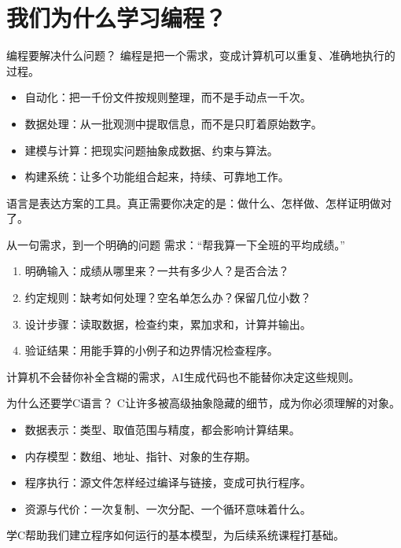 \section{我们为什么学习编程？}

\begin{frame}{编程要解决什么问题？}
    编程是把一个需求，变成计算机可以\alert{重复、准确地执行的过程}。
    \begin{itemize}
        \item 自动化：把一千份文件按规则整理，而不是手动点一千次。
        \item 数据处理：从一批观测中提取信息，而不是只盯着原始数字。
        \item 建模与计算：把现实问题抽象成数据、约束与算法。
        \item 构建系统：让多个功能组合起来，持续、可靠地工作。
    \end{itemize}
    语言是表达方案的工具。真正需要你决定的是：\alert{做什么、怎样做、怎样证明做对了}。
\end{frame}

\begin{frame}{从一句需求，到一个明确的问题}
    需求：“帮我算一下全班的平均成绩。”
    \begin{enumerate}
        \item \alert{明确输入}：成绩从哪里来？一共有多少人？是否合法？
        \item \alert{约定规则}：缺考如何处理？空名单怎么办？保留几位小数？
        \item \alert{设计步骤}：读取数据，检查约束，累加求和，计算并输出。
        \item \alert{验证结果}：用能手算的小例子和边界情况检查程序。
    \end{enumerate}
    计算机不会替你补全含糊的需求，AI生成代码也不能替你决定这些规则。
\end{frame}

\begin{frame}{为什么还要学C语言？}
    C让许多被高级抽象隐藏的细节，成为你必须理解的对象。
    \begin{itemize}
        \item \alert{数据表示}：类型、取值范围与精度，都会影响计算结果。
        \item \alert{内存模型}：数组、地址、指针、对象的生存期。
        \item \alert{程序执行}：源文件怎样经过编译与链接，变成可执行程序。
        \item \alert{资源与代价}：一次复制、一次分配、一个循环意味着什么。
    \end{itemize}
    学C帮助我们建立程序如何运行的基本模型，为后续系统课程打基础。
\end{frame}

